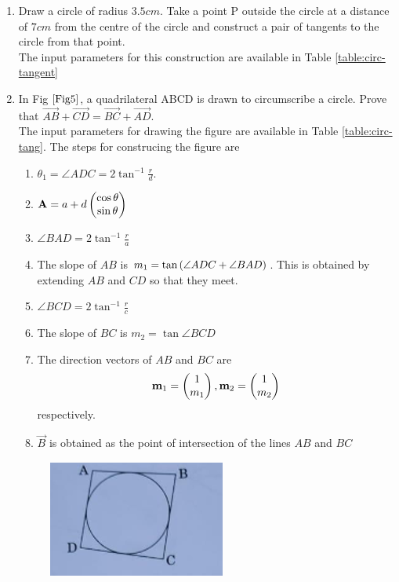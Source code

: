 \documentclass[journal,12pt,twocolumn]{IEEEtran}
\begin{document}
\begin{enumerate}
    \item Draw a circle of radius $3.5 cm$. Take a point P outside the circle at a distance of $7 cm$ from the centre of the circle and construct a pair of tangents to the circle from that point. \\
	    \solution The input parameters for this construction are available in Table 
	\eqref{table:circ-tangent}
\begin{table}[ht!]
	
\caption{}
	\label{table:circ-tangent}
\end{table}
    \item In Fig $\ref{Fig5}$, a quadrilateral ABCD is drawn to circumscribe a circle. Prove that $\vec{AB} + \vec{CD} = \vec{BC} + \vec{AD}$.\\
	    \solution   The input parameters for drawing the figure are available in Table
\eqref{table:circ-tang}.  The steps for construcing the figure are 
\begin{enumerate}
	\item  $\theta_1 = \angle ADC = 2\tan ^{-1}\frac{r}{d}$. 
	\item $\mathbf{A} = a+ d \begin{pmatrix}\cos \theta \\ \sin \theta\end{pmatrix}$
	\item $\angle BAD = 2 \tan ^{-1}\frac{r}{a}$
	\item The slope of $AB$ is $m_1 =   \tan\left(\angle ADC + \angle BAD\right)$.  This is obtained by extending $AB$ and $CD$ so that they meet.
	\item $\angle BCD = 2 \tan^{-1}\frac{r}{c}$
	\item The slope of $BC$ is $m_2 = \tan \angle BCD$
	\item The direction vectors of $AB$ and $BC$ are
		\begin{align}
			\mathbf{m}_1 = \begin{pmatrix}1 \\m_1\end{pmatrix},
			\mathbf{m}_2 = \begin{pmatrix}1 \\m_2\end{pmatrix}
		\end{align}
		respectively.
	\item $\vec{B}$ is obtained as the point of intersection of the lines $AB$ and $BC$
\end{enumerate}
\begin{table}[ht!]
	
\caption{}
\label{table:circ-tang}	
\end{table}
    \begin{figure}[h!]
        \centering
        \includegraphics[width=0.5\columnwidth]{Fig5.png}

\end{figure}
\end{enumerate}
\end{document}
